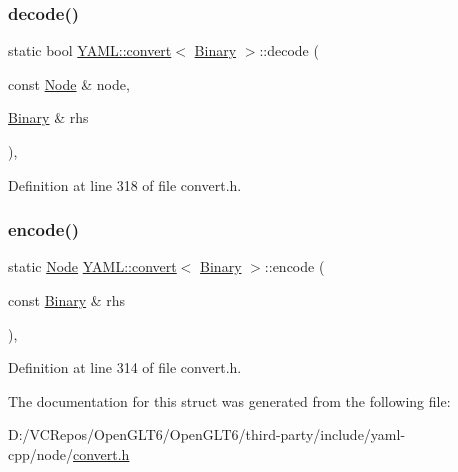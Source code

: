 \subsubsection{\texorpdfstring{decode()}{decode()}}
{\footnotesize\ttfamily static bool \mbox{\hyperlink{struct_y_a_m_l_1_1convert}{Y\+A\+M\+L\+::convert}}$<$ \mbox{\hyperlink{class_y_a_m_l_1_1_binary}{Binary}} $>$\+::decode (\begin{DoxyParamCaption}\item[{const \mbox{\hyperlink{class_y_a_m_l_1_1_node}{Node}} \&}]{node,  }\item[{\mbox{\hyperlink{class_y_a_m_l_1_1_binary}{Binary}} \&}]{rhs }\end{DoxyParamCaption})\hspace{0.3cm}{\ttfamily [inline]}, {\ttfamily [static]}}



Definition at line 318 of file convert.\+h.

\mbox{\label{struct_y_a_m_l_1_1convert_3_01_binary_01_4_a8dd2c818f89609cf183452be9f6dc12c}} 
\subsubsection{\texorpdfstring{encode()}{encode()}}
{\footnotesize\ttfamily static \mbox{\hyperlink{class_y_a_m_l_1_1_node}{Node}} \mbox{\hyperlink{struct_y_a_m_l_1_1convert}{Y\+A\+M\+L\+::convert}}$<$ \mbox{\hyperlink{class_y_a_m_l_1_1_binary}{Binary}} $>$\+::encode (\begin{DoxyParamCaption}\item[{const \mbox{\hyperlink{class_y_a_m_l_1_1_binary}{Binary}} \&}]{rhs }\end{DoxyParamCaption})\hspace{0.3cm}{\ttfamily [inline]}, {\ttfamily [static]}}



Definition at line 314 of file convert.\+h.



The documentation for this struct was generated from the following file\+:\begin{DoxyCompactItemize}
\item 
D\+:/\+V\+C\+Repos/\+Open\+G\+L\+T6/\+Open\+G\+L\+T6/third-\/party/include/yaml-\/cpp/node/\mbox{\hyperlink{convert_8h}{convert.\+h}}\end{DoxyCompactItemize}
